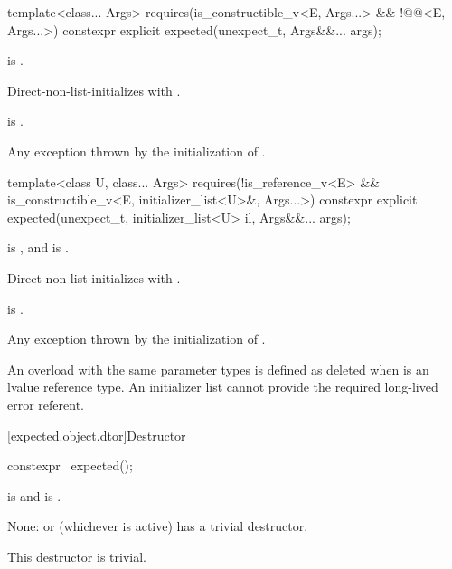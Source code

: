 %
\begin{itemdecl}
template<class... Args>
  requires(is_constructible_v<E, Args...> && !@@<E, Args...>)
constexpr explicit expected(unexpect_t, Args&&... args);
\end{itemdecl}

\begin{itemdescr}
\pnum
\constraints
{} is .

\pnum
\effects
Direct-non-list-initializes  with .

\pnum
\ensures
{} is .

\pnum
\throws
Any exception thrown by the initialization of .
\end{itemdescr}

%
\begin{itemdecl}
template<class U, class... Args>
  requires(!is_reference_v<E> && is_constructible_v<E, initializer_list<U>&, Args...>)
constexpr explicit expected(unexpect_t, initializer_list<U> il, Args&&... args);
\end{itemdecl}

\begin{itemdescr}
\pnum
\constraints
{} is , and  is .

\pnum
\effects
Direct-non-list-initializes  with .

\pnum
\ensures
{} is .

\pnum
\throws
Any exception thrown by the initialization of .

\pnum
\remarks
An overload with the same parameter types is defined as deleted when  is an lvalue reference type. An initializer list cannot provide the required long-lived error referent.
\end{itemdescr}

[expected.object.dtor]{Destructor}

%
\begin{itemdecl}
constexpr ~expected();
\end{itemdecl}

\begin{itemdescr}
\pnum
\constraints
{} is  and  is .

\pnum
\effects
None:  or  (whichever is active) has a trivial destructor.

\pnum
\remarks
This destructor is trivial.
\end{itemdescr}


